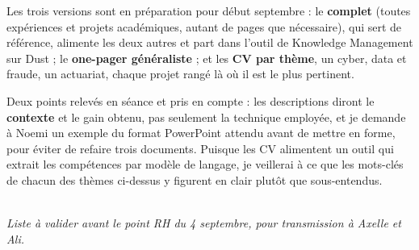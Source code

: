 \documentclass[11pt,a4paper]{article}
\begin{document}
\noindent Les trois versions sont en préparation pour début septembre : le \textbf{complet}
(toutes expériences et projets académiques, autant de pages que nécessaire), qui sert de
référence, alimente les deux autres et part dans l'outil de Knowledge Management sur Dust ;
le \textbf{one-pager généraliste} ; et les \textbf{CV par thème}, un cyber, data et fraude,
un actuariat, chaque projet rangé là où il est le plus pertinent.

\vspace{2pt}
\noindent Deux points relevés en séance et pris en compte : les descriptions diront le
\textbf{contexte} et le gain obtenu, pas seulement la technique employée, et je demande à
Noemi un exemple du format PowerPoint attendu avant de mettre en forme, pour éviter de
refaire trois documents. Puisque les CV alimentent un outil qui extrait les compétences par
modèle de langage, je veillerai à ce que les mots-clés de chacun des thèmes ci-dessus y
figurent en clair plutôt que sous-entendus.

\vspace{6pt}
\noindent{\color{accent}\rule{\textwidth}{0.6pt}}\\[1pt]
{\footnotesize\itshape Liste à valider avant le point RH du 4 septembre, pour transmission
à Axelle et Ali.}
\end{document}
